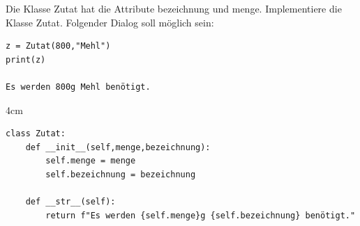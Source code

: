 \question[3]
Die Klasse Zutat hat die Attribute bezeichnung und menge. Implementiere die Klasse
Zutat. Folgender Dialog soll möglich sein:

\begin{lstlisting}
z = Zutat(800,"Mehl")
print(z)

Es werden 800g Mehl benötigt.
\end{lstlisting}

\begin{solutionbox}{4cm}
\begin{lstlisting}
class Zutat:
    def __init__(self,menge,bezeichnung):
        self.menge = menge
        self.bezeichnung = bezeichnung

    def __str__(self):
        return f"Es werden {self.menge}g {self.bezeichnung} benötigt." 
\end{lstlisting}
\end{solutionbox}
